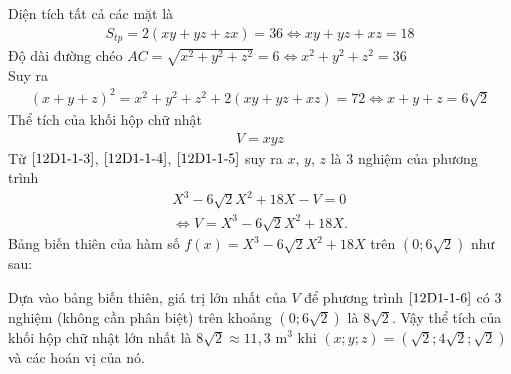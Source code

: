 \begin{bt}
{\begin{enumerate}[Cách 1.]
		 Diện tích tất cả các mặt là
		\begin{align}
			S_{tp}=2(xy+yz+zx)=36 \Leftrightarrow  xy+yz+xz=18 \tag{1} \label{12D1-1-3}
		\end{align}
		Độ dài đường chéo $AC=\sqrt{x^{2}+y^{2}+z^{2}}=6 \Leftrightarrow x^{2}+y^{2}+z^{2}=36$\\ 
		 Suy ra
		\begin{align}
			(x+y+z)^2 =x^{2}+y^{2}+z^{2}+2(xy+yz+xz)=72 \Leftrightarrow x+y+z  =6\sqrt{2} \tag{2}\label{12D1-1-4}
		\end{align}
		Thể tích của  khối hộp chữ nhật
		\begin{align}
			 V=xyz \tag{3}\label{12D1-1-5}
		\end{align}
		Từ $\eqref{12D1-1-3}$, $\eqref{12D1-1-4}$, $\eqref{12D1-1-5}$ suy ra $x$, $y$, $z$ là $3$ nghiệm của phương  trình
		\begin{align}
			 X^{3}-6\sqrt{2}X^{2}+18X-V=0 \nonumber \\
			\Leftrightarrow V= X^{3}-6\sqrt{2}X^{2}+18X. \tag{4} \label{12D1-1-6} 
		\end{align}
		Bảng biến thiên của hàm số $f(x)=X^{3}-6\sqrt{2}X^{2}+18X $ trên $\left( 0;6\sqrt{2}\right) $  như sau:
		\begin{center}
		\end{center}
		Dựa vào bảng biến thiên, giá trị lớn nhất của $V$ để phương trình $\eqref{12D1-1-6}$ có $3$ nghiệm (không cần phân biệt) trên khoảng $\left( 0;6\sqrt{2}\right) $ là $8\sqrt{2}$. 
		Vậy thể tích của khối hộp chữ nhật lớn nhất là 
		$8\sqrt{2}\approx 11{,}3 $ m$^{3}$  khi $(x;y;z)=\left( \sqrt{2};4\sqrt{2};\sqrt{2}\right) $ và các hoán vị của nó.
	\end{enumerate}
} 
\end{bt}

